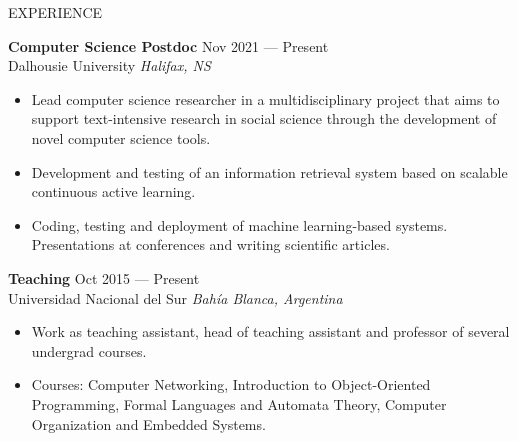 \documentclass{resume} %
\begin{document}
\begin{rSection}{EXPERIENCE}

\textbf{Computer Science Postdoc} \hfill Nov 2021 --- Present\\
Dalhousie University \hfill \textit{Halifax, NS}
    \vspace{-0.2cm}     
 \begin{itemize}
    \itemsep -3pt {} 
     \item Lead computer science researcher in a multidisciplinary project that aims to support text-intensive research in social science through the development of novel computer science tools.
    \vspace{-0.18cm}     
     \item Development and testing of an information retrieval system based on scalable continuous active learning.
    \vspace{-0.18cm}     
     \item Coding, testing and deployment of machine learning-based systems. Presentations at conferences and writing scientific articles. 
    \vspace{-0.1cm}     
 \end{itemize}
 
\textbf{Teaching} \hfill Oct 2015 --- Present\\
Universidad Nacional del Sur \hfill \textit{Bahía Blanca, Argentina}
    \vspace{-0.2cm}     
 \begin{itemize}
    \itemsep -3pt {} 
     \item Work as teaching assistant, head of teaching assistant and professor of several undergrad courses.
    \vspace{-0.18cm}     
     \item Courses: Computer Networking, Introduction to Object-Oriented Programming, Formal Languages and Automata Theory, Computer Organization  and  Embedded Systems. 

 \end{itemize}
\vspace{-0.2cm}
\end{rSection} 
\end{document}
